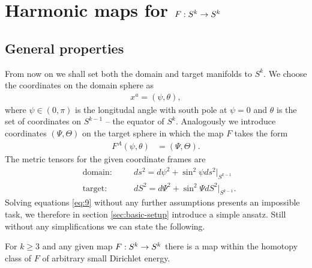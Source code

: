 \section{Harmonic maps for $F:S^k\rightarrow S^k$}
\label{sec:harmonic-maps-skra}

\subsection{General properties}
\label{sec:general-properties}

From now on we shall set both the domain and target manifolds to
$S^k$. We choose the coordinates on the domain sphere as
\begin{align}
  \label{eq:10}
  x^a=(\psi,\theta),
\end{align}
where $\psi\in(0,\pi)$ is the longitudal angle with
south pole at $\psi=0$ and $\theta$ is the set of coordinates on
$S^{k-1}$ -- the equator of $S^k$. Analogously we introduce
coordinates $(\Psi,\Theta)$ on the target sphere in which the map $F$
takes the form
\begin{align}
  \label{eq:11}
  F^A(\psi,\theta)&=(\Psi,\Theta).
\end{align}
The metric tensors for the given coordinate frames are
\begin{align}
  \label{eq:12}
  &\text{domain:}&\quad &ds^2=d\psi^2+\sin^2\psi ds^2\big|_{S^{k-1}}\\
  &\text{target:}&\quad &dS^2=d\Psi^2+\sin^2\Psi dS^2\big|_{S^{k-1}}.
\end{align}
Solving equations \eqref{eq:9} without any further assumptions
presents an impossible task, we therefore in section
\ref{sec:basic-setup} introduce a simple ansatz. Still without any
simplifications we can state the following.

\begin{theorem}\label{thm:skk-energy-bound}
  For $k\ge3$ and any given map $F:S^k\rightarrow S^k$ there is a map within
  the homotopy class of $F$ of arbitrary small Dirichlet energy.
\end{theorem}

